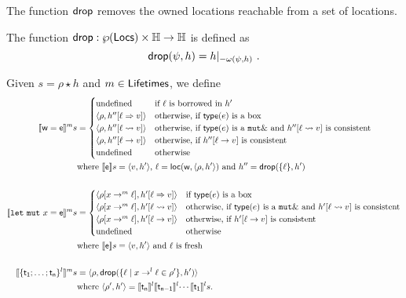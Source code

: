 The function $\drop$ removes the owned locations reachable from a set of locations.
%
\begin{definition}[Drop]\label{def:drop}
  The function $\drop:\wp(\Locs)\times\mathbb{H}\to\mathbb{H}$ is defined as
  \[
  \drop(\psi,h)=h|_{-{\omega(\psi,h)}}~.
  \]
\end{definition}

\begin{definition}\label{def:semantics_terms}
  Given $s=\rho\star h$ and $m\in\Lifetimes$, we define
  \begin{align*}
    \denl[\mathsf{w}=\mathsf{e}]{m}{s}&=
    \begin{cases}
      \text{undefined} & \text{if $\ell$ is borrowed in $h'$}\\
      \langle\rho,h''[\ell\Rightarrow v]\rangle & \text{otherwise, if $\type(e)$ is a box}\\
      \langle\rho,h''[\ell\leadsto v]\rangle & \text{otherwise, if $\type(e)$ is a $\mathtt{mut}\borrow$ and $h''[\ell\leadsto v]$ is consistent}\\
      \langle\rho,h''[\ell\to v]\rangle & \text{otherwise, if $h''[\ell\to v]$ is consistent}\\
      \text{undefined} & \text{otherwise}
    \end{cases}\\
    &\text{where $\den[\mathsf{e}]{s}=\langle v,h'\rangle$, $\ell=\loc(\mathsf{w},\langle\rho,h'\rangle)$ and
      $h''=\drop(\{\ell\},h')$}\\
    \mbox{}\\
    \denl[\mathtt{let\ mut}\ x=\mathsf{e}]{m}{s}&=
    \begin{cases}
      \langle\rho[x\to^m\ell],h'[\ell\Rightarrow v]\rangle & \text{if $\type(e)$ is a box}\\
      \langle\rho[x\to^m\ell],h'[\ell\leadsto v]\rangle & \text{otherwise, if $\type(e)$ is a $\mathtt{mut}\borrow$ and $h'[\ell\leadsto v]$ is consistent}\\
      \langle\rho[x\to^m\ell],h'[\ell\to v]\rangle & \text{otherwise, if $h'[\ell\to v]$ is consistent}\\
      \text{undefined} & \text{otherwise}
    \end{cases}\\
    &\text{where $\den[\mathsf{e}]{s}=\langle v,h'\rangle$ and $\ell$ is fresh}\\
    \mbox{}\\
    \denl[\{\mathsf{t_1};\ldots;\mathsf{t_n}\}^l]{m}{s}&=\langle\rho,\drop(\{\ell\mid x\to^l\ell\in\rho'\},h')\rangle\\
    &\text{where $\langle\rho',h'\rangle=\denl[\mathsf{t_n}]{l}{\denl[\mathsf{t_{n-1}}]{l}{\cdots\denl[\mathsf{t_1}]{l}{s}}}$.}
  \end{align*}
\end{definition}

